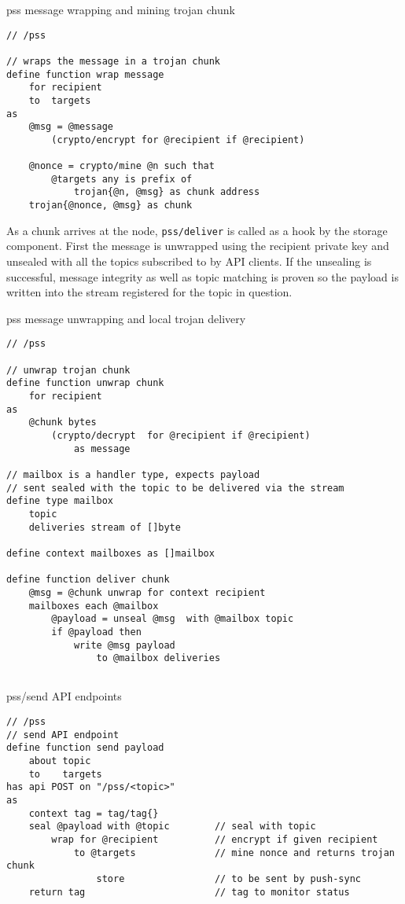 \begin{definition}{pss message wrapping and mining trojan chunk}\label{def:wrap}
\begin{lstlisting}[language=buzz1]
// /pss

// wraps the message in a trojan chunk
define function wrap message 
    for recipient
    to  targets
as 
    @msg = @message 
        (crypto/encrypt for @recipient if @recipient) 

    @nonce = crypto/mine @n such that
        @targets any is prefix of
            trojan{@n, @msg} as chunk address 
    trojan{@nonce, @msg} as chunk 

\end{lstlisting}
\end{definition}

As a chunk arrives at the node,  \lstinline{pss/deliver} is called as a hook by the storage component.
First the message is unwrapped using the recipient private key and unsealed with all the topics subscribed to by API clients. If the unsealing is successful, message integrity as well as topic matching is proven so the payload is written into the stream registered for the topic in question.

\begin{definition}{pss message unwrapping and local trojan delivery}\label{def:unwrap}
\begin{lstlisting}[language=buzz1]
// /pss

// unwrap trojan chunk 
define function unwrap chunk
    for recipient
as
    @chunk bytes 
        (crypto/decrypt  for @recipient if @recipient)
            as message

// mailbox is a handler type, expects payload
// sent sealed with the topic to be delivered via the stream 
define type mailbox
    topic
    deliveries stream of []byte 
    
define context mailboxes as []mailbox

define function deliver chunk
    @msg = @chunk unwrap for context recipient
    mailboxes each @mailbox 
        @payload = unseal @msg  with @mailbox topic
        if @payload then 
            write @msg payload 
                to @mailbox deliveries 
    

\end{lstlisting}
\end{definition}


\begin{definition}{pss/send API endpoints}\label{def:send}
\begin{lstlisting}[language=buzz1]
// /pss
// send API endpoint
define function send payload
    about topic
    to    targets
has api POST on "/pss/<topic>"
as 
    context tag = tag/tag{}
    seal @payload with @topic        // seal with topic
        wrap for @recipient          // encrypt if given recipient
            to @targets              // mine nonce and returns trojan chunk
                store                // to be sent by push-sync
    return tag                       // tag to monitor status 
    
\end{lstlisting}
\end{definition}

